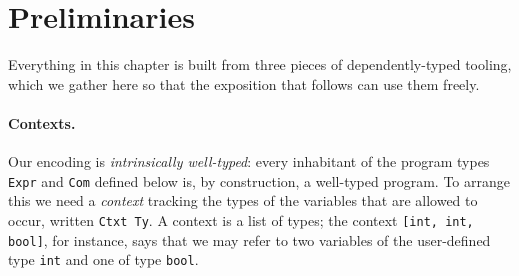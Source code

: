 % 
% 
% 
\section{Preliminaries}
\label{sec:mlir:preliminaries}

Everything in this chapter is built from three pieces of dependently-typed
tooling, which we gather here so that the exposition that follows can use them
freely.

\paragraph{Contexts.}
Our encoding is \emph{intrinsically well-typed}: every inhabitant of the program
types \texttt{Expr} and \texttt{Com} defined below is, by construction, a
well-typed program. To arrange this we need a \emph{context} tracking the types
of the variables that are allowed to occur, written \texttt{Ctxt Ty}. A context
is a list of types; the context \texttt{[int, int, bool]}, for instance, says
that we may refer to two variables of the user-defined type \texttt{int} and one
of type \texttt{bool}.

